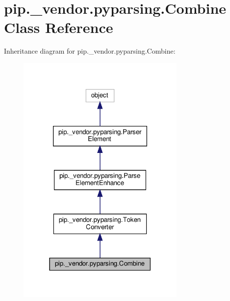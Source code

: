 \hypertarget{classpip_1_1__vendor_1_1pyparsing_1_1Combine}{}\section{pip.\+\_\+vendor.\+pyparsing.\+Combine Class Reference}
\label{classpip_1_1__vendor_1_1pyparsing_1_1Combine}


Inheritance diagram for pip.\+\_\+vendor.\+pyparsing.\+Combine\+:
\nopagebreak
\begin{figure}[H]
\begin{center}
\leavevmode
\includegraphics[width=234pt]{classpip_1_1__vendor_1_1pyparsing_1_1Combine__inherit__graph}
\end{center}
\end{figure}


